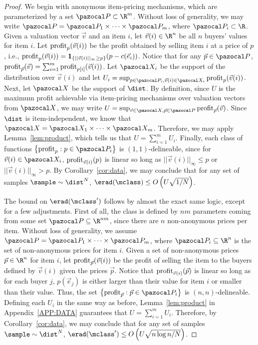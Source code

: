 \itemProduct*

\begin{proof}
We begin with anonymous item-pricing mechanisms, which are parameterized by a set $\pspace \subset \R^m$. Without loss of generality, we may write $\pspace = \pspace_1 \times \cdots \times \pspace_m$, where $\pspace_i \subset \R$. Given a valuation vector $\vec{v}$ and an item $i$, let $\vec{v}(i) \in \R^n$ be all $n$ buyers' values for item $i$. Let $\textnormal{profit}_p(\vec{v}(i))$ be the profit obtained by selling item $i$ at a price of $p$, i.e., $\textnormal{profit}_p(\vec{v}(i)) = \textbf{1}_{\left\{||\vec{v}(i)||_{\infty} \geq p\right\}} (p - c(\vec{e}_i))$. Notice that for any $\vec{p} \in \pspace$, $\textnormal{profit}_{\vec{p}}(\vec{v}) = \sum_{i = 1}^m \textnormal{profit}_{p[i]}(\vec{v}(i))$. Let $\domain_i$ be the support of the distribution over $\vec{v}(i)$ and let $U_i = \sup_{p \in \pspace_i, \vec{v}(i) \in \domain_i} \profit_{p}(\vec{v}(i))$. Next, let
$\domain$ be the support of $\dist$. By definition, since $U$ is the maximum profit achievable via item-pricing mechanisms over valuation vectors from $\domain$, we may write $U = \sup_{\vec{v} \in \domain, \vec{p} \in \pspace}\profit_{\vec{p}}(\vec{v})$.  Since $\dist$ is item-independent, we know that $\domain = \domain_1 \times \cdots \times \domain_m$. Therefore, we may apply Lemma~\ref{lem:product}, which tells us that $U = \sum_{i = 1}^m U_i$. Finally, each class of functions $\left\{\profit_{p} : p \in \pspace_i\right\}$ is $(1, 1)$-delineable, since for $\vec{v}(i) \in \domain_i$, $\textnormal{profit}_{\vec{v}(i)}(p)$ is linear so long as $||\vec{v}(i)||_{\infty} \leq p$ or $||\vec{v}(i)||_{\infty} > p$. By Corollary~\ref{cor:data}, we may conclude that for any set of samples $\sample \sim \dist^N$, $\erad(\mclass) \leq O\left(U\sqrt{1/N}\right)$.

The bound on $\erad(\mclass')$ follows by almost the exact same logic, except for a few adjustments. First of all, the class is defined by $nm$ parameters coming from some set $\pspace \subseteq \R^{nm}$, since there are $n$ non-anonymous prices per item. Without loss of generality, we assume $\pspace = \pspace_1 \times \cdots \times \pspace_m$, where $\pspace_i \subseteq \R^n$ is the set of non-anonymous prices for item $i$. Given a set of non-anonymous prices $\vec{p} \in \R^n$ for item $i$, let $\textnormal{profit}_{\vec{p}}(\vec{v}(i))$ be the profit of selling the item to the buyers defined by $\vec{v}(i)$ given the prices $\vec{p}$. Notice that $\textnormal{profit}_{\vec{v}(i)}(\vec{p})$ is linear so long as for each buyer $j$, $p(\vec{e}_j)$ is either larger than their value for item $i$ or smaller than their value. Thus, the set $\left\{\profit_{\vec{p}} : \vec{p} \in \pspace_i\right\}$ is $(n,n)$-delineable. Defining each $U_i$ in the same way as before, Lemma~\ref{lem:product} in Appendix~\ref{APP:DATA} guarantees that $U = \sum_{i = 1}^m U_i$. Therefore, by Corollary~\ref{cor:data}, we may conclude that for any set of samples $\sample \sim \dist^N$, $\erad(\mclass') \leq O\left(U\sqrt{n \log n/N}\right)$.
\end{proof}

